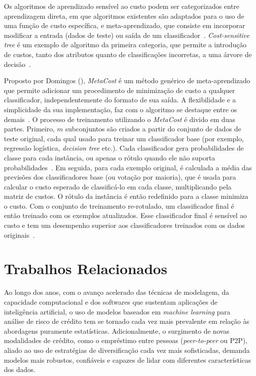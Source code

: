 Os algoritmos de aprendizado sensível ao custo podem ser categorizados entre aprendizagem direta, em que algoritmos existentes são adaptados para o uso de uma função de custo específica, e meta-aprendizado, que consiste em incorporar modificar a entrada (dados de teste) ou saída de um classificador~\cite{FernndezCs2018}. \textit{Cost-sensitive tree} é um exemplo de algoritmo da primeira categoria, que permite a introdução de custos, tanto dos atributos quanto de classificações incorretas, a uma árvore de decisão~\cite{Ling2006}.

Proposto por Domingos (\citeyear{Domingos1999}), \textit{MetaCost} é um método genérico de meta-aprendizado que permite adicionar um procedimento de minimização de custo a qualquer classificador, independentemente do formato de sua saída. A flexibilidade e a simplicidade da sua implementação, faz com o algoritmo se destaque entre os demais~\cite[text]{FernndezCs2018, Wang2018}. O processo de treinamento utilizando o \textit{MetaCost} é divido em duas partes. Primeiro, \(m\) subconjuntos são criados a partir do conjunto de dados de teste original, cada qual usado para treinar um classificador base (por exemplo, regressão logística, \textit{decision tree} etc.). Cada classificador gera probabilidades de classe para cada instância, ou apenas o rótulo quando ele não suporta probabilidades~\cite{Araf2024}. Em seguida, para cada exemplo original, é calculada a média das previsões dos classificadores base (ou votação por maioria), que é usada para calcular o custo esperado de classificá-lo em cada classe, multiplicando pela matriz de custos. O rótulo da instância é então redefinido para a classe minimiza o custo. Com o conjunto de treinamento re-rotulado, um classificador final é então treinado com os exemplos atualizados. Esse classificador final é sensível ao custo e tem um desempenho superior aos classificadores treinados com os dados originais~\cite{Chen2021}.

\section{Trabalhos Relacionados}

Ao longo dos anos, com o avanço acelerado das técnicas de modelagem, da capacidade computacional e dos softwares que sustentam aplicações de inteligência artificial, o uso de modelos baseados em \textit{machine learning} para análise de risco de crédito tem se tornado cada vez mais prevalente em relação às abordagens puramente estatísticas. Adicionalmente, o surgimento de novas modalidades de crédito, como o empréstimo entre pessoas (\textit{peer-to-peer} ou P2P), aliado ao uso de estratégias de diversificação cada vez mais sofisticadas, demanda modelos mais robustos, confiáveis e capazes de lidar com diferentes características dos dados.

